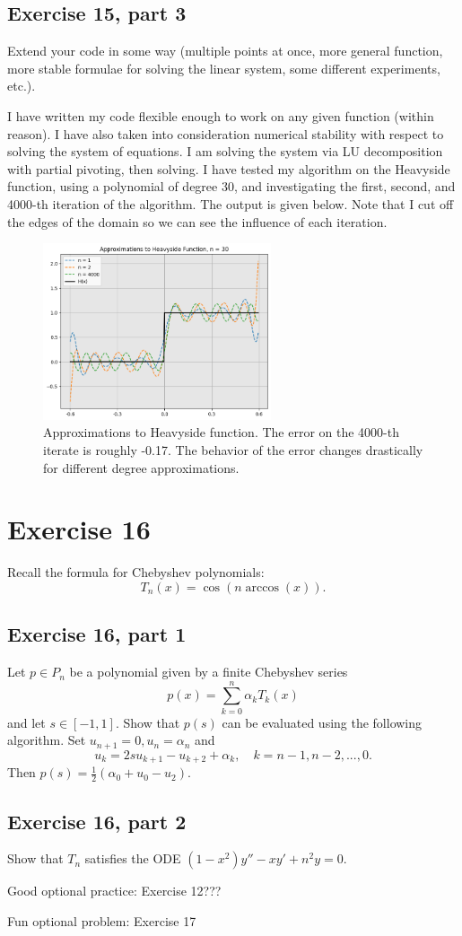 \newpage
\subsection{Exercise 15, part 3}
Extend your code in some way (multiple points at once, more general function, more stable formulae for solving the linear system, some different experiments, etc.).
\partbreak
\begin{solution}

    I have written my code flexible enough to work on any given function (within reason). I have also taken into consideration numerical stability with respect to solving the system of equations. I am solving the system via LU decomposition with partial pivoting, then solving. I have tested my algorithm on the Heavyside function, using a polynomial of degree 30, and investigating the first, second, and 4000-th iteration of the algorithm. The output is given below. Note that I cut off the edges of the domain so we can see the influence of each iteration. 
\end{solution}
\vspace{1in}
\begin{figure}[!hb]
    \centering
    \includegraphics[width = 0.6\textwidth]{Figures/RemezHeavyside.png}
    \caption{Approximations to Heavyside function. The error on the 4000-th iterate is roughly -0.17. The behavior of the error changes drastically for different degree approximations.}
    \label{fig:RemezHeavyside}
\end{figure}
\newpage
\section{Exercise 16}
Recall the formula for Chebyshev polynomials:
\[T_n(x) = \cos(n\arccos(x)).\]
\subsection{Exercise 16, part 1}
Let $p \in P_n$ be a polynomial given by a finite Chebyshev series
\[p(x) = \sum_{k = 0}^n \alpha_k T_k(x)\]
and let $s \in [-1, 1]$. Show that $p(s)$ can be evaluated using the following algorithm. Set $u_{n+1} = 0, u_n = \alpha_n$ and 
\[u_k = 2su_{k+1} - u_{k+2} + \alpha_k, \quad k = n - 1, n - 2, ..., 0.\]
Then $p(s) = \frac{1}{2}(\alpha_0 + u_0 - u_2).$

\newpage
\subsection{Exercise 16, part 2}
Show that $T_n$ satisfies the ODE $(1 - x^2)y'' - xy' + n^2y = 0$.

\newpage
Good optional practice:
Exercise 12???

Fun optional problem:
Exercise 17


